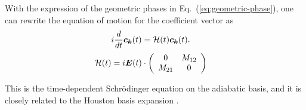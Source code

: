 With the expression of the geometric phases in Eq.~(\ref{eq;geometric-phase}), one can rewrite the equation of motion for the coefficient vector as
\begin{align}
	 & i\frac{d}{dt} \boldsymbol c_{\boldsymbol k}(t) = \mathcal{H}(t) \boldsymbol c_{\boldsymbol k}(t)
	.
	\label{eq:tdse-ad-basis}
\end{align}
\begin{align}
	 & \mathcal{H}(t)=
	i\boldsymbol E(t)\cdot \left(
	\begin{array}{cc}
			0      & M_{12} \\
			M_{21} & 0
		\end{array}
	\right)
\end{align}

This is the time-dependent Schr\"odinger equation on the adiabatic basis, and it is closely related to the Houston basis expansion \cite{PhysRev.57.184,PhysRevB.33.5494}.
